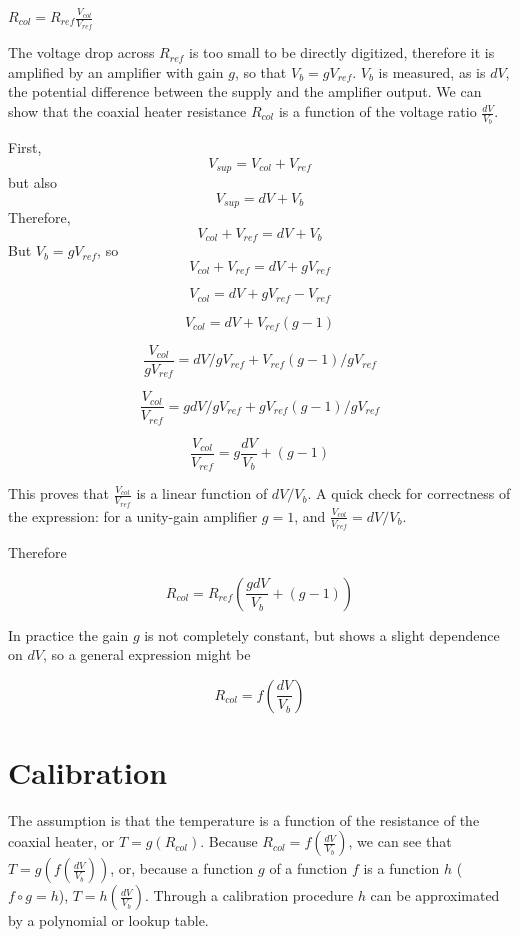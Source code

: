 \(R_{col} = R_{ref}\frac{V_{col}}{V_{ref}}\)

The voltage drop across $R_{ref}$ is too small to be directly digitized,
therefore it is amplified by an amplifier with gain $g$, so that $V_b =
gV_{ref}$. $V_b$ is measured, as is $dV$, the potential difference between the
supply and the amplifier output. We can show that the coaxial heater resistance
\(R_{col}\) is a function of the voltage ratio \(\frac{dV}{V_b}\).

First, 
\[ V_{sup} = V_{col} + V_{ref} \] 
but also
\[ V_{sup} = dV + V_b \]
Therefore,
\[ V_{col} + V_{ref} = dV + V_b \]
But \(V_{b} = g V_{ref}\), so
\[ V_{col} + V_{ref} = dV + gV_{ref} \]

\[ V_{col} = dV + gV_{ref} - V_{ref} \]

\[ V_{col} = dV + V_{ref}(g - 1) \]

\[ \frac{\displaystyle V_{col}}{\displaystyle gV_{ref}} = dV/gV_{ref} + V_{ref}(g-1)/gV_{ref} \]

\[\frac{\displaystyle V_{col}}{\displaystyle V_{ref}} = gdV/gV_{ref} + gV_{ref}(g-1)/gV_{ref} \]

\[\frac{\displaystyle V_{col}}{\displaystyle V_{ref}} = g\frac{dV}{V_b} + (g-1) \]

This proves that \( \frac{\displaystyle V_{col}}{\displaystyle V_{ref}} \) is a
linear function of $dV/V_b$. A quick check for correctness of the expression:
for a unity-gain amplifier $g = 1$, and $\frac{\displaystyle
V_{col}}{\displaystyle V_{ref}} = dV/V_b$.

Therefore 

\[ R_{col} = R_{ref} \left(\frac{g{dV}}{V_b} + (g-1) \right) \]

In practice the gain \(g\) is not completely constant, but shows a slight
dependence on \(dV\), so a general expression might be

\[ R_{col} = f\left(\frac{dV}{V_b} \right) \]


\section{Calibration}

The assumption is that the temperature is a function of the resistance of the
coaxial heater, or \( T = g(R_{col}) \). Because \( R_{col}=f(\frac{dV}{V_b}) \),
we can see that \( T = g(f(\frac{dV}{V_b})) \), or, because a function \(g\) of
a function \(f\) is a function \(h\) (\(f \circ g = h \)), \( T =
h(\frac{dV}{V_b}) \).  Through a calibration procedure \(h\) can be
approximated by a polynomial or lookup table.

